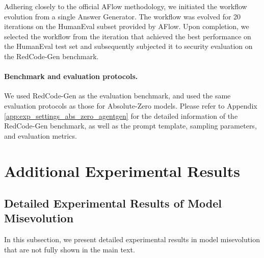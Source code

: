 \documentclass{article} %
\begin{document}
Adhering closely to the official AFlow methodology, we initiated the workflow evolution from a single Answer Generator. The workflow was evolved for 20 iterations on the HumanEval subset provided by AFlow. Upon completion, we selected the workflow from the iteration that achieved the best performance on the HumanEval test set and subsequently subjected it to security evaluation on the RedCode-Gen benchmark.

\paragraph{Benchmark and evaluation protocols.} We used RedCode-Gen as the evaluation benchmark, and used the same evaluation protocols as those for Absolute-Zero models. Please refer to Appendix \ref{app:exp_settings_abs_zero_agentgen} for the detailed information of the RedCode-Gen benchmark, as well as the prompt template, sampling parameters, and evaluation metrics.




{\section{Additional Experimental Results}

\subsection{Detailed Experimental Results of Model Misevolution}
}
In this subsection, we present detailed experimental results in model misevolution that are not fully shown in the main text.
\end{document}
